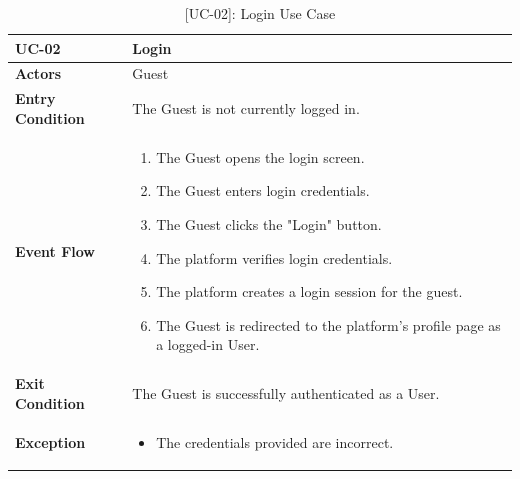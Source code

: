 \newpage
\begin{table}[H]
    \centering
    \setlength\extrarowheight{2pt}
    \renewcommand{\arraystretch}{1.2}
    \begin{tabularx}{\textwidth}{|>{\bfseries}l|X|}
    \hline
    UC-02 & Login \\ \hline
    Actors & Guest\\ \hline
    Entry Condition & The Guest is not currently logged in.\\ \hline
    Event Flow & 
    \begin{enumerate}
      \item The Guest opens the login screen.
      \item The Guest enters login credentials.
      \item The Guest clicks the "Login" button.
      \item The platform verifies login credentials.
      \item The platform creates a login session for the guest.
      \item The Guest is redirected to the platform’s profile page as a logged-in User.
    \end{enumerate}
    \\ \hline
    Exit Condition & The Guest is successfully authenticated as a User.\\ \hline
    Exception & 
    \begin{itemize}
        \item The credentials provided are incorrect.
    \end{itemize}
    \\ \hline
   \end{tabularx}
   \caption{[UC-02]: Login Use Case}
    \label{UC-02}
\end{table}

